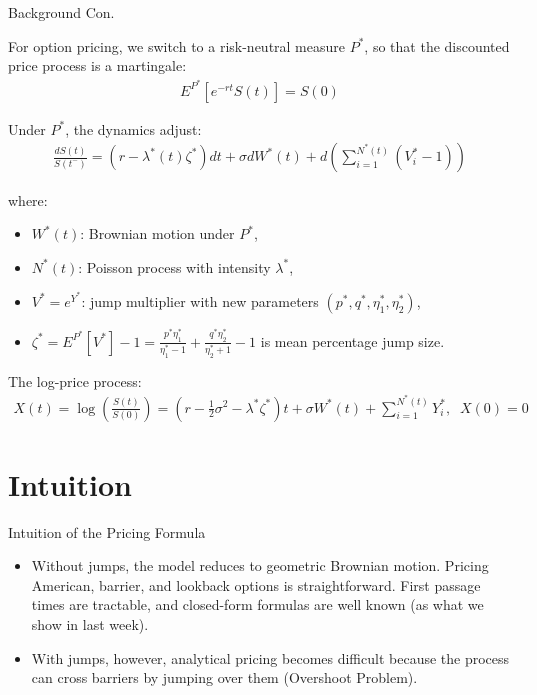 \documentclass{beamer}
\begin{document}
\begin{frame}{Background Con.}

    {\footnotesize \footnotesize
    \par For option pricing, we switch to a risk-neutral measure \( P^* \), so that the discounted price process is a martingale:
    \begin{align*}
        E^{P^*}[e^{-rt}S(t)] = S(0)
    \end{align*}
    \par Under \( P^* \), the dynamics adjust:
    \begin{align*}
        \frac{dS(t)}{S(t^-)} = (r - \lambda^*(t)\zeta^*)dt + \sigma dW^*(t) + d\left(\sum_{i=1}^{N^*(t)}(V_i^*-1)\right)
    \end{align*}
    \par where:
    \begin{itemize}
        \item \( W^*(t) \): Brownian motion under \( P^* \),
        \item \( N^*(t) \): Poisson process with intensity \( \lambda^* \),
        \item \( V^* = e^{Y^*} \): jump multiplier with new parameters \( (p^*, q^*, \eta_1^*, \eta_2^*) \),
        \item \( \zeta^* = E^{P^*}[V^*] - 1 = \frac{p^{*}\eta_{1}^{*}}{\eta_{1}^{*}-1} + \frac{q^{*}\eta_{2}^{*}}{\eta_{2}^{*}+1} - 1\) is mean percentage jump size.
    \end{itemize}
    \par The log-price process:  
    \begin{align*}
        X(t) = \log\left(\frac{S(t)}{S(0)}\right) = \left(r - \frac{1}{2}\sigma^2 - 
    \lambda^*\zeta^*\right)t + \sigma W^*(t) + \sum_{i=1}^{N^*(t)} Y_i^*,\;\;X(0)=0
    \end{align*}
    }
    
    
\end{frame}


\section{Intuition}
\begin{frame}{Intuition of the Pricing Formula}

    \begin{itemize}
    \item Without jumps, the model reduces to geometric Brownian motion. Pricing American, 
    barrier, and lookback options is straightforward. First passage times are tractable, and 
    closed-form formulas are well known (as what we show in last week).
    \vspace{1em}
    \item With jumps, however, analytical pricing becomes difficult 
    because the process can cross barriers by jumping over them (Overshoot Problem).
\end{itemize}
    
\end{frame}
\end{document}
